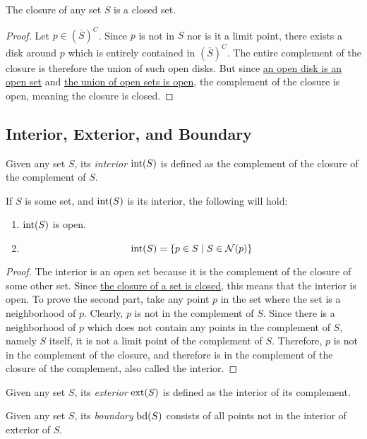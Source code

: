 \documentclass{refbook}
\begin{document}
\begin{lemma}
The closure of any set $S$ is a closed set.
\end{lemma}
\begin{proof}
Let $p \in \left(\overline{S}\right)^C$. Since $p$ is not in $S$ nor is it a limit point, there exists a disk around $p$ which is entirely contained in $\left(\overline{S}\right)^C$. The entire complement of the closure is therefore the union of such open disks. But since \hyperlink{Open Disks are Open Sets}{an open disk is an open set} and \hyperlink{Properties of Open Sets}{the union of open sets is open}, the complement of the closure is open, meaning the closure is closed.
\end{proof}
\subsection{Interior, Exterior, and Boundary}
\begin{definition}
Given any set $S$, its \emph{interior} $\operatorname{int}({S})$ is defined as the complement of the closure of the complement of $S$.
\end{definition}
\begin{lemma}
If $S$ is some set, and $\operatorname{int}({S})$ is its interior, the following will hold:
\begin{enumerate}
\item $\operatorname{int}({S})$ is open.
\item \begin{equation*} \operatorname{int}({S}) = \{p \in S \mid S \in \operatorname{\mathcal{N}}({p})\}\end{equation*}
\end{enumerate}
\end{lemma}
\begin{proof}
The interior is an open set because it is the complement of the closure of some other set. Since \hyperlink{Closure of a Set}{the closure of a set is closed}, this means that the interior is open.
To prove the second part, take any point $p$ in the set where the set is a neighborhood of $p$. Clearly, $p$ is not in the complement of $S$. Since there is a neighborhood of $p$ which does not contain any points in the complement of $S$, namely $S$ itself, it is not a limit point of the complement of $S$. Therefore, $p$ is not in the complement of the closure, and therefore is in the complement of the closure of the complement, also called the interior.
\end{proof}
\begin{definition}
Given any set $S$, its \emph{exterior} $\operatorname{ext}({S})$ is defined as the interior of its complement.
\end{definition}
\begin{definition}
Given any set $S$, its \emph{boundary} $\operatorname{bd}({S})$ consists of all points not in the interior of exterior of $S$.
\end{definition}
\end{document}
